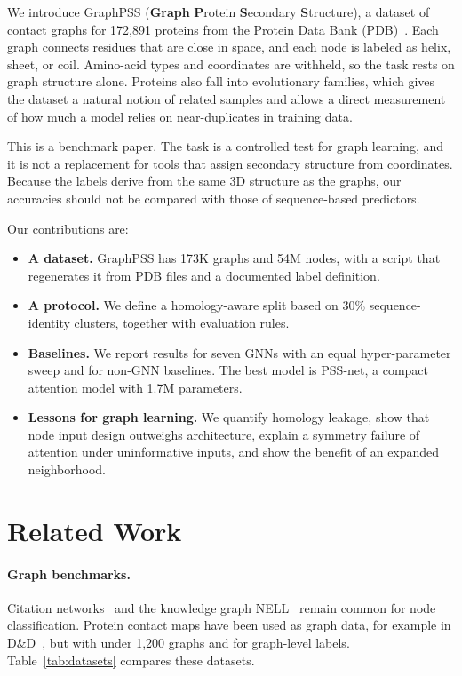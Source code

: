 \documentclass[pdflatex,sn-mathphys-num]{sn-jnl}
\begin{document}
We introduce GraphPSS (\textbf{Graph} \textbf{P}rotein \textbf{S}econdary \textbf{S}tructure), a dataset of contact graphs for 172,891 proteins from the Protein Data Bank (PDB)~\cite{pdb}. Each graph connects residues that are close in space, and each node is labeled as helix, sheet, or coil. Amino-acid types and coordinates are withheld, so the task rests on graph structure alone. Proteins also fall into evolutionary families, which gives the dataset a natural notion of related samples and allows a direct measurement of how much a model relies on near-duplicates in training data.

This is a benchmark paper. The task is a controlled test for graph learning, and it is not a replacement for tools that assign secondary structure from coordinates. Because the labels derive from the same 3D structure as the graphs, our accuracies should not be compared with those of sequence-based predictors.

Our contributions are:
\begin{itemize}
    \item \textbf{A dataset.} GraphPSS has 173K graphs and 54M nodes, with a script that regenerates it from PDB files and a documented label definition.
    \item \textbf{A protocol.} We define a homology-aware split based on 30\% sequence-identity clusters, together with evaluation rules.
    \item \textbf{Baselines.} We report results for seven GNNs with an equal hyper-parameter sweep and for non-GNN baselines. The best model is PSS-net, a compact attention model with 1.7M parameters.
    \item \textbf{Lessons for graph learning.} We quantify homology leakage, show that node input design outweighs architecture, explain a symmetry failure of attention under uninformative inputs, and show the benefit of an expanded neighborhood.
\end{itemize}

\section{Related Work}\label{sec:related}

\paragraph{Graph benchmarks.} Citation networks~\cite{cora,citeseer,pubmed} and the knowledge graph NELL~\cite{Carlson_Betteridge_Kisiel_Settles_Hruschka_Mitchell_2010} remain common for node classification. Protein contact maps have been used as graph data, for example in D\&D~\cite{10.1093/bioinformatics/bti1007}, but with under 1,200 graphs and for graph-level labels. Table~\ref{tab:datasets} compares these datasets.
\end{document}
